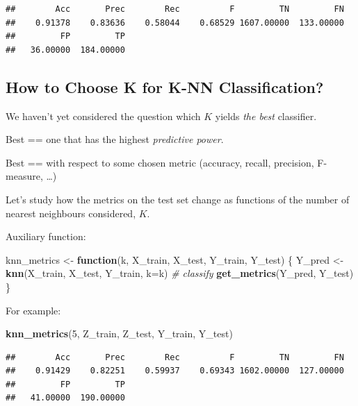 \documentclass[10pt,b5paper,krantz1]{krantz}
\newenvironment{Shaded}{\begin{snugshade}}{\end{snugshade}}
\newcommand{\CommentTok}[1]{\textcolor[rgb]{0.37,0.37,0.37}{\textit{#1}}}
\newcommand{\ControlFlowTok}[1]{\textcolor[rgb]{0.27,0.27,0.27}{\textbf{#1}}}
\newcommand{\DataTypeTok}[1]{\textcolor[rgb]{0.27,0.27,0.27}{#1}}
\newcommand{\DecValTok}[1]{\textcolor[rgb]{0.06,0.06,0.06}{#1}}
\newcommand{\KeywordTok}[1]{\textcolor[rgb]{0.27,0.27,0.27}{\textbf{#1}}}
\newcommand{\NormalTok}[1]{#1}
\newcommand{\StringTok}[1]{\textcolor[rgb]{0.5,0.5,0.5}{#1}}
\begin{document}
\begin{verbatim}
##        Acc       Prec        Rec          F         TN         FN 
##    0.91378    0.83636    0.58044    0.68529 1607.00000  133.00000 
##         FP         TP 
##   36.00000  184.00000
\end{verbatim}

\hypertarget{how-to-choose-k-for-k-nn-classification}{%
\subsection{How to Choose K for K-NN Classification?}\label{how-to-choose-k-for-k-nn-classification}}

We haven't yet considered the question which \(K\) yields \emph{the best}
classifier.

Best == one that has the highest \emph{predictive power}.

Best == with respect to some chosen metric (accuracy, recall, precision, F-measure, \ldots{})

Let's study how the metrics on the test set change as functions of the number of nearest neighbours considered, \(K\).

Auxiliary function:

\begin{Shaded}
\begin{Highlighting}[]
\NormalTok{knn_metrics <-}\StringTok{ }\ControlFlowTok{function}\NormalTok{(k, X_train, X_test, Y_train, Y_test)}
\NormalTok{\{}
\NormalTok{    Y_pred <-}\StringTok{ }\KeywordTok{knn}\NormalTok{(X_train, X_test, Y_train, }\DataTypeTok{k=}\NormalTok{k) }\CommentTok{# classify}
    \KeywordTok{get_metrics}\NormalTok{(Y_pred, Y_test)}
\NormalTok{\}}
\end{Highlighting}
\end{Shaded}

For example:

\begin{Shaded}
\begin{Highlighting}[]
\KeywordTok{knn_metrics}\NormalTok{(}\DecValTok{5}\NormalTok{, Z_train, Z_test, Y_train, Y_test)}
\end{Highlighting}
\end{Shaded}

\begin{verbatim}
##        Acc       Prec        Rec          F         TN         FN 
##    0.91429    0.82251    0.59937    0.69343 1602.00000  127.00000 
##         FP         TP 
##   41.00000  190.00000
\end{verbatim}
\end{document}
